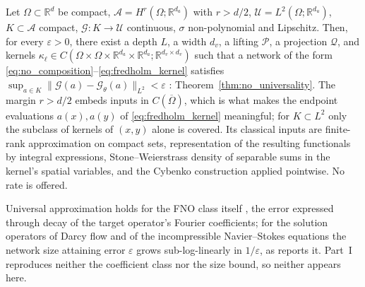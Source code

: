 \begin{theorem}\label{thm:appa-no-universality}
Let $\Omega \subset \mathbb{R}^d$ be compact, $\mathcal{A} = H^r(\Omega;\mathbb{R}^{d_a})$
with $r > d/2$,
$\mathcal{U} = L^2(\Omega;\mathbb{R}^{d_u})$, $K \subset \mathcal{A}$ compact,
$\mathcal{G} : K \to \mathcal{U}$ continuous, $\sigma$ non-polynomial and Lipschitz. Then,
for every $\varepsilon > 0$, there exist a depth $L$, a width $d_v$, a lifting
$\mathcal{P}$, a projection $\mathcal{Q}$, and kernels $\kappa_\ell \in C(\Omega \times \Omega \times \mathbb{R}^{d_a} \times
\mathbb{R}^{d_a}; \mathbb{R}^{d_v \times d_v})$ such that a network of the form \eqref{eq:no_composition}--\eqref{eq:fredholm_kernel}
satisfies $\sup_{a \in K}\|\mathcal{G}(a) - \mathcal{G}_\theta(a)\|_{L^2} < \varepsilon$
\cite{kovachki2023neural}: Theorem~\ref{thm:no_universality}. The margin $r > d/2$ embeds
inputs in $C(\overline{\Omega})$, which is what makes the endpoint evaluations $a(x), a(y)$
of \eqref{eq:fredholm_kernel} meaningful; for $K \subset L^2$ only the subclass of kernels
of $(x,y)$ alone is covered. Its classical inputs are
finite-rank approximation on compact sets, representation of the resulting functionals by
integral expressions, Stone--Weierstrass density of separable sums in the kernel's spatial
variables, and the Cybenko construction applied pointwise. No rate is offered.
\end{theorem}

\begin{theorem}\label{thm:appa-fno-universal}
Universal approximation holds for the FNO class itself \cite{kovachki2021universal}, the error
expressed through decay of
the target operator's Fourier coefficients; for the solution operators of Darcy flow and of
the incompressible Navier--Stokes equations the network size attaining error $\varepsilon$
grows sub-log-linearly in $1/\varepsilon$, as
 reports it. Part~I reproduces
neither the coefficient class nor the size bound, so neither appears here.
\end{theorem}

